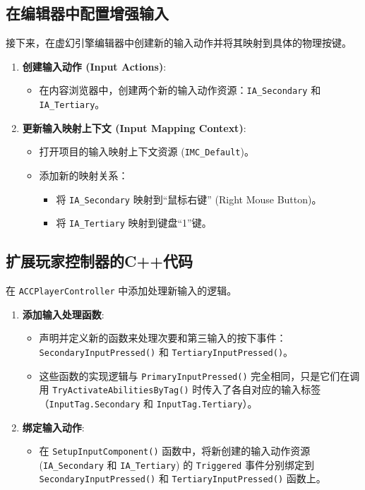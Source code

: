 \documentclass[10pt,CJKmath]{zhbook-v1}
\newcommand{\il}[1]{\texttt{#1}}%
\begin{document}
\subsection{在编辑器中配置增强输入}
接下来，在虚幻引擎编辑器中创建新的输入动作并将其映射到具体的物理按键。
\begin{enumerate}
    \item \textbf{创建输入动作 (Input Actions)}:
    \begin{itemize}
        \item 在内容浏览器中，创建两个新的输入动作资源：\texttt{IA\_Secondary} 和 \texttt{IA\_Tertiary}。
    \end{itemize}
    \item \textbf{更新输入映射上下文 (Input Mapping Context)}:
    \begin{itemize}
        \item 打开项目的输入映射上下文资源 (\texttt{IMC\_Default})。
        \item 添加新的映射关系：
        \begin{itemize}
            \item 将 \texttt{IA\_Secondary} 映射到“鼠标右键” (Right Mouse Button)。
            \item 将 \texttt{IA\_Tertiary} 映射到键盘“1”键。
        \end{itemize}
    \end{itemize}
\end{enumerate}

\subsection{扩展玩家控制器的C++代码}
在 \texttt{ACCPlayerController} 中添加处理新输入的逻辑。
\begin{enumerate}
    \item \textbf{添加输入处理函数}:
    \begin{itemize}
        \item 声明并定义新的函数来处理次要和第三输入的按下事件：\il{SecondaryInputPressed()} 和 \il{TertiaryInputPressed()}。
        \item 这些函数的实现逻辑与 \il{PrimaryInputPressed()} 完全相同，只是它们在调用 \il{TryActivateAbilitiesByTag()} 时传入了各自对应的输入标签（\il{InputTag.Secondary} 和 \il{InputTag.Tertiary}）。
    \end{itemize}
    \item \textbf{绑定输入动作}:
    \begin{itemize}
        \item 在 \texttt{SetupInputComponent()} 函数中，将新创建的输入动作资源 (\texttt{IA\_Secondary} 和 \texttt{IA\_Tertiary}) 的 \texttt{Triggered} 事件分别绑定到 \texttt{SecondaryInputPressed()} 和 \texttt{TertiaryInputPressed()} 函数上。
    \end{itemize}
\end{enumerate}
\end{document}
